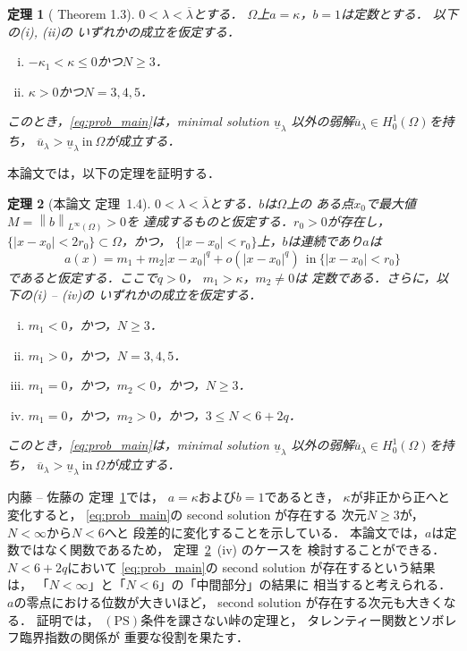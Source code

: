 \documentclass{jsarticle}
\theoremstyle{plain}
\newtheorem{thm}{定理}
\renewcommand{\bar}[1]{\overline{#1}}
\newcommand{\tin}{\text{in}~}
\begin{document}
\begin{thm}[\cite{MR2886160} Theorem 1.3]
 \label{thm:second_solution_naito_sato}
 $0 < \lambda < \bar{\lambda}$とする．
 $\Omega$上$a = \kappa$，$b = 1$は定数とする．
 以下の(i), (ii)の
 いずれかの成立を仮定する．
 \begin{enumerate}[(i)]
  \item $-\kappa_1 < \kappa \leq 0$かつ$N \geq 3$．
  \item $\kappa > 0$かつ$N = 3, 4, 5$．
 \end{enumerate}
 このとき，\ref{eq:prob_main}は，minimal solution
 $\underline{u}_\lambda$
 以外の弱解$\bar{u}_\lambda \in H_0^1(\Omega)$を持ち，
 $\bar{u}_\lambda >
 \underline{u}_\lambda ~\tin \Omega$が成立する．
\end{thm}

本論文では，以下の定理を証明する．

\begin{thm}[本論文 定理~1.4] \label{thm:second_solution}
 $0 < \lambda < \bar{\lambda}$とする．$b$は$\Omega$上の
 ある点$x_0$で最大値$M = \left\| b \right\|_{L^\infty(\Omega)} > 0$を
 達成するものと仮定する．$r_0 > 0$が存在し，
 $\{ \lvert x - x_0 \rvert < 2r_0 \} \subset \Omega$，かつ，
 $\{ \lvert x - x_0 \rvert < r_0 \}$上，$b$は連続であり$a$は
 \begin{equation}
  a(x) = m_1 + m_2 \lvert x-x_0 \rvert^{q} 
  + o(\lvert x-x_0 \rvert^{q}) \ \ \tin \{ \lvert x - x_0 \rvert < r_0
  \}  \label{eq:a_q}
 \end{equation}
 であると仮定する．ここで$q > 0$，
 $m_1 > \kappa$，$m_2 \neq 0$は
 定数である．さらに，以下の(i) -- (iv)の
 いずれかの成立を仮定する．
 \begin{enumerate}[(i)]
  \item $m_1 < 0$，かつ，$N \geq 3$．
  \item $m_1 > 0$，かつ，$N = 3, 4, 5$．
  \item $m_1 = 0$，かつ，$m_2 < 0$，かつ，$N \geq 3$．
  \item $m_1 = 0$，かつ，$m_2 > 0$，かつ，$3 \leq N < 6 + 2q$．
 \end{enumerate}
 このとき，\ref{eq:prob_main}は，minimal solution
 $\underline{u}_\lambda$
 以外の弱解$\bar{u}_\lambda \in H_0^1(\Omega)$を持ち，
 $\bar{u}_\lambda >
 \underline{u}_\lambda ~\tin \Omega$が成立する．
\end{thm}

内藤 -- 佐藤の
定理~\ref{thm:second_solution_naito_sato}では，
$a = \kappa$および$b = 1$であるとき，
$\kappa$が非正から正へと変化すると，
\ref{eq:prob_main}の second solution が存在する
次元$N \geq 3$が，
$N < \infty$から$N < 6$へと
段差的に変化することを示している．
本論文では，$a$は定数ではなく関数であるため，
定理~\ref{thm:second_solution}~(iv) のケースを
検討することができる．$N < 6 + 2q$において
\ref{eq:prob_main}の second solution が存在するという結果は，
「$N < \infty$」と「$N < 6$」の「中間部分」の結果に
相当すると考えられる．
$a$の零点における位数が大きいほど，
second solution が存在する次元も大きくなる．
証明では，
$(\mathrm{PS})$条件を課さない峠の定理と，
タレンティー関数とソボレフ臨界指数の関係が
重要な役割を果たす．
\end{document}
